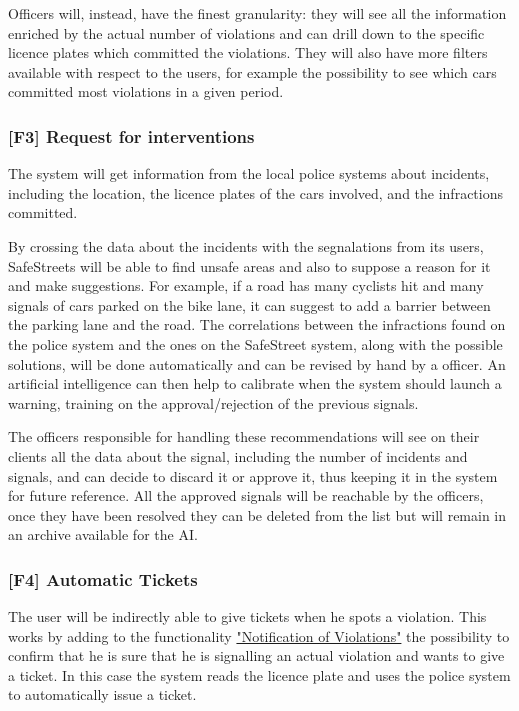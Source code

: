 Officers will, instead, have the finest granularity: they will see all the information enriched by the actual number of violations and can drill down to the specific licence plates which committed the violations.
They will also have more filters available with respect to the users, for example the possibility to see which cars committed most violations in a given period.

\subsubsection[Request for interventions]{[F3] Request for interventions\hypertarget{sec:f3}{}}
\label{sec:request_for_interventions}
The system will get information from the local police systems about incidents, including the location, the licence plates of the cars involved, and the infractions committed.

By crossing the data about the incidents with the segnalations from its users, SafeStreets will be able to find unsafe areas and also to suppose a reason for it and make suggestions.
For example, if a road has many cyclists hit and many signals of cars parked on the bike lane, it can suggest to add a barrier between the parking lane and the road.
The correlations between the infractions found on the police system and the ones on the SafeStreet system, along with the possible solutions, will be done automatically and can be revised by hand by a officer.
An artificial intelligence can then help to calibrate when the system should launch a warning, training on the approval/rejection of the previous signals.

The officers responsible for handling these recommendations will see on their clients all the data about the signal,
including the number of incidents and signals, and can decide to discard it or approve it, thus keeping it in the system for future reference.
All the approved signals will be reachable by the officers, once they have been resolved they can be deleted from the list but will remain in an archive available for the AI.


\subsubsection[Automatic Tickets]{[F4] Automatic Tickets\hypertarget{sec:f4}{}}
\label{sec:automatic_tickets}
The user will be indirectly able to give tickets when he spots a violation. This works by adding to the functionality
\hyperref[sec:notification_of_violations]{"Notification of Violations"}
the possibility to confirm that he is sure that he is signalling an actual violation and wants to give a ticket.
In this case the system reads the licence plate and uses the police system to automatically issue a ticket.

